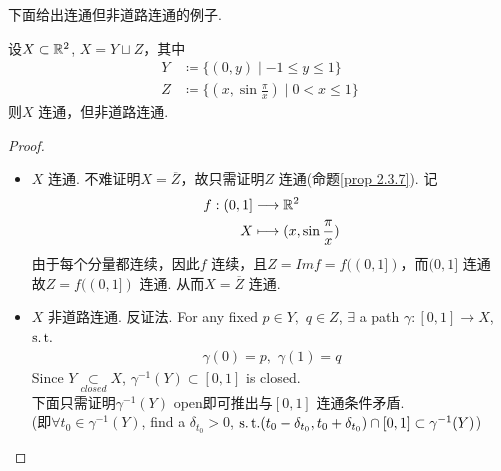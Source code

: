 	\vspace{2em}
	下面给出连通但非道路连通的例子.
	\begin{example}\label{ex 2.3.9}
		设$X \subset \mathbb{R}^2$, $X = Y \sqcup Z$，其中
		\begin{align}
			Y &\coloneqq \{ (0 , y) \mid -1 \leq y \leq 1 \} \\
			Z &\coloneqq \{ (x , \sin{\frac{\pi}{x}}) \mid 0 < x \leq 1 \}
		\end{align}
		则$X$ 连通，但非道路连通.
		
		\vspace{2em}
		\begin{proof}
			\begin{itemize}
				\item $X$ 连通. 不难证明$X = \overline{Z}$，故只需证明$Z$ 连通(命题\ref{prop 2.3.7}). 记
				\begin{align}
					f : (0 , 1] &\longrightarrow \mathbb{R}^2 \\
					X &\longmapsto (x , \sin{\frac{\pi}{x}})
				\end{align}
				由于每个分量都连续，因此$f$ 连续，且$Z = Imf = f((0 , 1])$，而$(0 , 1]$ 连通\\
				故$Z = f((0 , 1])$ 连通. 从而$X = \overline{Z}$ 连通.
				
				\item $X$ 非道路连通. 反证法. For any fixed $p \in Y , \,\, q \in Z$, $\exists$ a path $\gamma : [0 , 1] \longrightarrow X$, $\operatorname{s.t.}$
				\begin{align}
					\gamma(0) = p , \,\, \gamma(1) = q
				\end{align}
				Since $Y \underset{closed}{\subset} X$, $\gamma^{-1}(Y) \subset [0 , 1]$ is closed.\\
				下面只需证明$\gamma^{-1}(Y)$ open即可推出与$[0 , 1]$ 连通条件矛盾.\\
				(即$\forall t_0 \in \gamma^{-1}(Y)$, find a $\delta_{t_0} > 0$, $\operatorname{s.t.} (t_0 - \delta_{t_0} , t_0 + \delta_{t_0}) \cap [0 , 1] \subset \gamma^{-1}(Y)$)\\
				

\end{itemize}
\end{proof}
\end{example}
